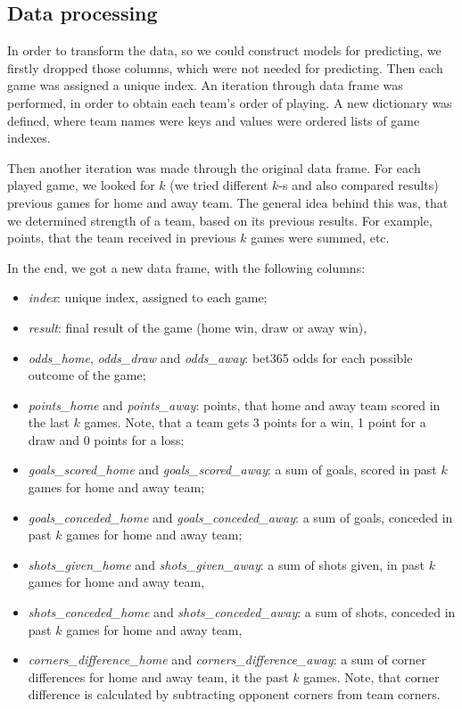 \documentclass[conference]{IEEEtran}
\begin{document}
\subsection{Data processing}

In order to transform the data, so we could construct models for predicting, we firstly dropped those columns, which were not needed
for predicting. Then each game was assigned a unique index. An iteration through data frame was performed, in order to obtain each team's
order of playing. A new dictionary was defined, where team names were keys and values were ordered lists of game indexes. 

Then another iteration was made through the original data frame. For each played game, we looked for $k$ (we tried different $k$-s
and also compared results) previous games for home and away team. The general idea behind this was, that we determined strength of
a team, based on its previous results. For example, points, that the team received in previous $k$ games were summed, etc.

In the end, we got a new data frame, with the following columns:
\begin{itemize}
    \item \textit{index}: unique index, assigned to each game;
    \item \textit{result}: final result of the game (home win, draw or away win),
    \item \textit{odds\_home}, \textit{odds\_draw} and \textit{odds\_away}: bet365 odds for each possible outcome of the game;
    \item \textit{points\_home} and \textit{points\_away}: points, that home and away team scored in the last $k$ games. Note,
    that a team gets 3 points for a win, 1 point for a draw and 0 points for a loss;
    \item \textit{goals\_scored\_home} and \textit{goals\_scored\_away}: a sum of goals, scored in past $k$ games for home and away
    team;
    \item \textit{goals\_conceded\_home} and \textit{goals\_conceded\_away}: a sum of goals, conceded in past $k$ games for home 
    and away team;
    \item \textit{shots\_given\_home} and \textit{shots\_given\_away}: a sum of shots given, in past $k$ games for home 
    and away team,
    \item \textit{shots\_conceded\_home} and \textit{shots\_conceded\_away}: a sum of shots, conceded in past $k$ games for home 
    and away team,
    \item \textit{corners\_difference\_home} and \textit{corners\_difference\_away}: a sum of corner differences for home and away 
    team, it the past $k$ games. Note, that corner difference is calculated by subtracting opponent corners from team corners. 
\end{itemize}
\end{document}
